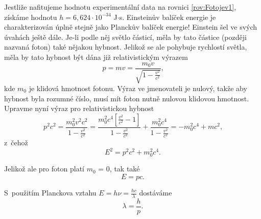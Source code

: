 Jestliže nafitujeme hodnotu  experimentální data na rovnici \ref{rov:Fotojev1}, získáme hodnotu $h= 6,624\cdot10^{-34}$ J$\cdot$s. Einsteinův balíček energie je charakterizován úplně stejně jako Planckův balíček energie! Einstein šel ve svých úvahách ještě dále. Je-li podle něj světlo částicí, měla by tato částice (později nazvaná foton) také nějakou hybnost. Jelikož se ale pohybuje rychlostí světla, měla by tato hybnost být dána již relativistickým výrazem
\begin{equation}
p = mv = \frac{m_0 v}{\sqrt{1-\frac{v^2}{c^2}}}\mbox{,}
\label{rov:Fotojev2}
\end{equation}
kde $m_0$ je klidová hmotnost fotonu. Výraz ve jmenovateli je nulový, takže aby hybnost byla rozumné číslo, musí mít foton nutně nulovou klidovou hmotnost. Upravme nyní výraz pro relativistickou hybnost
\begin{equation}
p^2c^2 = \frac{m_0^2v^2c^2}{1-\frac{v^2}{c^2}} = \frac{m_0^2 c^4 [\frac{v^2}{c^2}-1]}{1-\frac{v^2}{c^2}} + \frac{m_0^2 c^4}{1-\frac{v^2}{c^2}} = -m_0^2 c^4 + mc^2\mbox{,}
\label{Fotojev3}
\end{equation}
z~čehož
\begin{equation}
E^2 = p^2c^2+ m_0^2c^4\mbox{.}
\label{Fotojev4}
\end{equation}

\noindent Jelikož ale pro foton platí $m_0$ = 0, tak také
\begin{equation}
E=pc\mbox{.}
\label{rov:Fotojev5}
\end{equation}

\noindent S~použitím Planckova vztahu $E = h\nu = \frac{hc}{\lambda}$ dostáváme
\begin{equation}
\boxed{\lambda = \frac{h}{p}\mbox{.}}
\label{rov:Fotojev6}
\end{equation}

